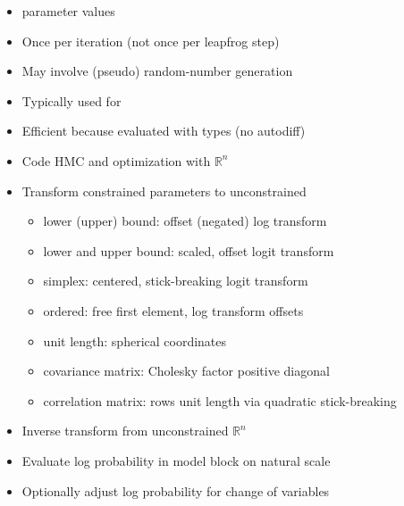 \documentclass[10pt]{report}
\begin{document}
%
\begin{itemize}
\item {} parameter values
\item Once per iteration (not once per leapfrog step)
\item May involve (pseudo) random-number generation
\item Typically used for 
\item Efficient because evaluated with  types (no autodiff)
\end{itemize}


%
\begin{itemize}
\item Code HMC and optimization with $\mathbb{R}^n$ 
\item Transform constrained parameters to unconstrained
  \vspace*{-2pt}
  {\small
    \begin{itemize}
    \item lower (upper) bound: offset (negated) log transform
    \item lower and upper bound: scaled, offset logit transform
    \item simplex: centered, stick-breaking logit transform
    \item ordered: free first element, log transform offsets
    \item unit length: spherical coordinates
    \item covariance matrix: Cholesky factor positive diagonal 
    \item correlation matrix: rows unit length via quadratic stick-breaking
    \end{itemize}
  }
\end{itemize}


%
\begin{itemize}
\item Inverse transform from unconstrained $\mathbb{R}^n$
\item Evaluate log probability in model block on natural scale
\item Optionally adjust log probability for change of variables
\end{itemize}
\end{document}
